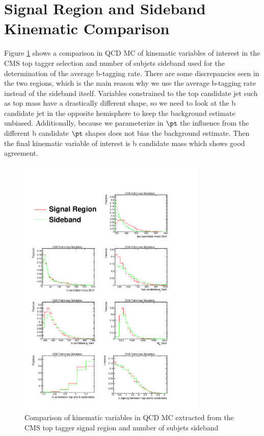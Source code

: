 \section{Signal Region and Sideband Kinematic Comparison}
\label{sec:SBvsSR}
Figure \ref{figs:SBtoSR} shows a comparison in QCD MC of kinematic variables of interest in the CMS top tagger selection and number of subjets sideband used for the determination of the average b-tagging rate.  There are some discrepancies 
seen in the two regions, which is the main reason why we use the average b-tagging rate instead of the sideband itself.  Variables constrained to the top candidate jet such as top mass have a drastically different shape, so we need to look at the 
b candidate jet in the opposite hemisphere to keep the background estimate unbiased.  Additionally, because we parameterize in $\pt$ the influence from the different b candidate $\pt$ shapes does not bias the background estimate.  Then the final 
kinematic variable of interest is b candidate mass which shows good agreement.  


\begin{figure}[Htcb]
\centering
\includegraphics[width=0.8\textwidth]{figs/SBtoSR.pdf}
\caption{Comparison of kinematic variables in QCD MC extracted from the CMS top tagger signal region and number of subjets sideband}
\label{figs:SBtoSR}
\end{figure}



